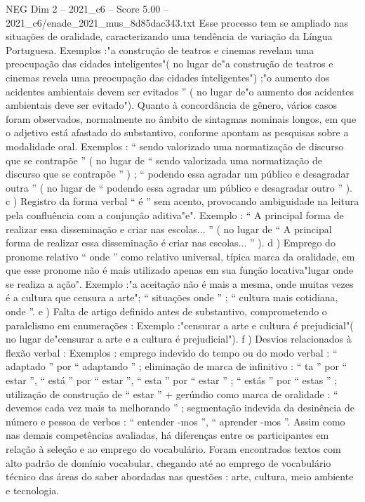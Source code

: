 \begin{textsample}{NEG Dim 2 – 2021\_c6 – Score 5.00 – 2021\_c6/enade\_2021\_mus\_8d85dac343.txt}
Esse processo tem se ampliado nas situações de oralidade, caracterizando uma tendência de variação da Língua Portuguesa.
Exemplos :"a construção de teatros e cinemas revelam uma preocupação das cidades inteligentes"( no lugar de"a construção de teatros e cinemas revela uma preocupação das cidades inteligentes") ;"o aumento dos acidentes ambientais devem ser evitados ” ( no lugar de"o aumento dos acidentes ambientais deve ser evitado").
Quanto à concordância de gênero, vários casos foram observados, normalmente no âmbito de sintagmas nominais longos, em que o adjetivo está afastado do substantivo, conforme apontam as pesquisas sobre a modalidade oral.
Exemplos : “ sendo valorizado uma normatização de discurso que se contrapõe ” ( no lugar de “ sendo valorizada uma normatização de discurso que se contrapõe ” ) ; “ podendo essa agradar um público e desagradar outra ” ( no lugar de “ podendo essa agradar um público e desagradar outro ” ). c ) Registro da forma verbal “ é ” sem acento, provocando ambiguidade na leitura pela confluência com a conjunção aditiva"e".
Exemplo : “ A principal forma de realizar essa disseminação e criar nas escolas... ” ( no lugar de “ A principal forma de realizar essa disseminação é criar nas escolas... ” ). d ) Emprego do pronome relativo “ onde ” como relativo universal, típica marca da oralidade, em que esse pronome não é mais utilizado apenas em sua função locativa"lugar onde se realiza a ação".
Exemplo :"a aceitação não é mais a mesma, onde muitas vezes é a cultura que censura a arte"; “ situações onde ” ; “ cultura mais cotidiana, onde ”. e ) Falta de artigo definido antes de substantivo, comprometendo o paralelismo em enumerações : Exemplo :"censurar a arte e cultura é prejudicial"( no lugar de"censurar a arte e a cultura é prejudicial"). f ) Desvios relacionados à flexão verbal : Exemplos : emprego indevido do tempo ou do modo verbal : “ adaptado ” por “ adaptando ” ; eliminação de marca de infinitivo : “ ta ” por “ estar ”, “ está ” por “ estar ”, “ esta ” por “ estar ” ; “ estás ” por “ estas ” ; utilização de construção de “ estar ” + gerúndio como marca de oralidade : “ devemos cada vez mais ta melhorando ” ; segmentação indevida da desinência de número e pessoa de verbos : “ entender -mos ”, “ aprender -mos ”.
Assim como nas demais competências avaliadas, há diferenças entre os participantes em relação à seleção e ao emprego do vocabulário.
Foram encontrados textos com alto padrão de domínio vocabular, chegando até ao emprego de vocabulário técnico das áreas do saber abordadas nas questões : arte, cultura, meio ambiente e tecnologia.

\end{textsample}
